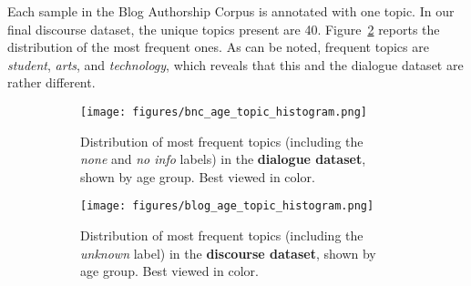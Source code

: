 
Each sample in the Blog Authorship Corpus is annotated with one topic. In our final discourse dataset, the unique topics present are 40. Figure~\ref{fig:blog_age_topic_dist_incl_unk} reports the distribution of the most frequent ones. As can be noted, frequent topics are \emph{student}, \emph{arts}, and \emph{technology}, which 
reveals that this and the dialogue dataset are rather different.


\begin{figure}[H]
     \centering
     \begin{subfigure}[b]{0.45\textwidth}
        \centering
        \texttt{[image: figures/bnc\_age\_topic\_histogram.png]}
        \caption{Distribution of most frequent topics (including the \emph{none} and \emph{no info} labels) in the \textbf{dialogue dataset}, shown by age group. Best viewed in color.}
        \label{fig:bnc_age_topic_dist_incl_unk}
     \end{subfigure}
     \hfill
     \begin{subfigure}[b]{0.45\textwidth}
        \centering
        \texttt{[image: figures/blog\_age\_topic\_histogram.png]}
        \caption{Distribution of most frequent topics (including the \emph{unknown} label) in the \textbf{discourse dataset}, shown by age group. Best viewed in color.}
        \label{fig:blog_age_topic_dist_incl_unk}
     \end{subfigure}
        \caption{}
        \label{fig:bnc_blog_age_topic_dist_incl_unk}
\end{figure}






